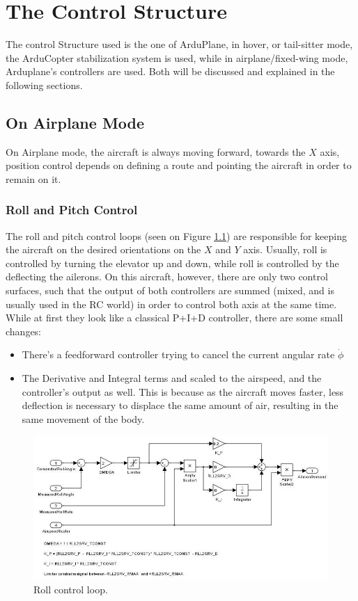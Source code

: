 \chapter{The Control Structure} \label{chap:control}

The control Structure used is the one of ArduPlane, in hover, or tail-sitter mode, the ArduCopter stabilization system is used, while in airplane/fixed-wing mode, Arduplane's controllers are used. Both will be discussed and explained in the following sections.

\section{On Airplane Mode}

On Airplane mode, the aircraft is always moving forward, towards the $X$ axis, position control depends on defining a route and pointing the aircraft in order to remain on it.

\subsection{Roll and Pitch Control}

The roll and pitch control loops (seen on Figure \ref{fig:roll_loop}) are responsible for keeping the aircraft on the desired orientations on the $X$ and $Y$ axis. Usually, roll is controlled by turning the elevator up and down, while roll is controlled by the deflecting the ailerons. On this aircraft, however, there are only two control surfaces, such that the output of both controllers are summed (mixed, and is usually used in the RC world) in order to control both axis at the same time.
While at first they look like a classical P+I+D controller, there are some small changes:

\begin{itemize}
\item There's a feedforward controller trying to cancel the current angular rate $\dot{\phi}$
\item The Derivative and Integral terms and scaled to the airspeed, and the controller's output as well. This is because  as the aircraft moves faster, less deflection is necessary to displace the same amount of air, resulting in the same movement of the body.
\end{itemize}


\begin{figure}[H]
\centering
  \includegraphics[width=\linewidth]{figs/roll_control_loop.jpg}
  \caption{Roll control loop.}
  \label{fig:roll_loop}
\end{figure}

